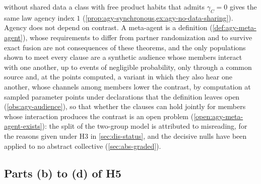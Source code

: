 without shared data a class with free product habits that admits $\gamma_C=0$ gives the same law agency index $1$ (\cref{prop:agy-synchronous,ex:agy-no-data-sharing}). Agency does not depend on contrast. A meta-agent is a definition (\cref{def:agy-meta-agent}), whose requirements to differ from partner randomization and to survive exact fusion are not consequences of these theorems, and the only populations shown to meet every clause are a synthetic audience whose members interact with one another, up to events of negligible probability, only through a common source and, at the points computed, a variant in which they also hear one another, whose channels among members lower the contrast, by computation at sampled parameter points under declarations that the definition leaves open (\cref{obs:agy-audience}), so that whether the clauses can hold jointly for members whose interaction produces the contrast is an open problem (\cref{open:agy-meta-agent-exists}): the split of the two-group model is attributed to misreading, for the reasons given under H3 in \cref{sec:dis-status}, and the decisive nulls have been applied to no abstract collective (\cref{sec:abs-graded}).

\subsection{Parts (b) to (d) of H5}\label{sup:dis-parts-b-to-d-of-h5}

